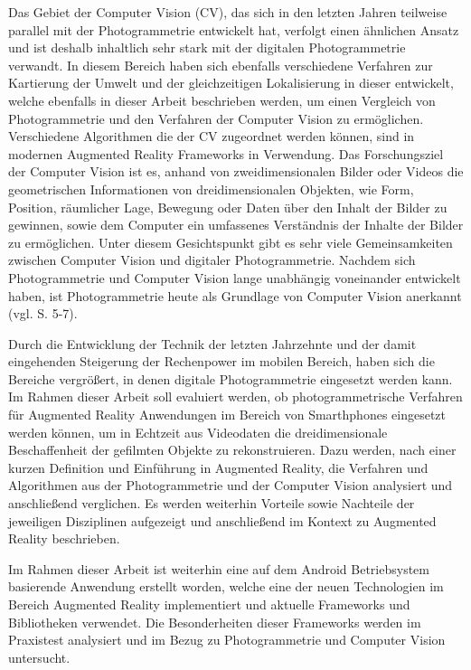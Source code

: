 Das Gebiet der Computer Vision (CV), das sich in den letzten Jahren teilweise parallel mit der Photogrammetrie entwickelt hat, verfolgt einen ähnlichen Ansatz und ist deshalb inhaltlich sehr stark mit der digitalen Photogrammetrie verwandt. In diesem Bereich haben sich ebenfalls verschiedene Verfahren zur Kartierung der Umwelt und der gleichzeitigen Lokalisierung in dieser entwickelt, welche ebenfalls in dieser Arbeit beschrieben werden, um einen Vergleich von Photogrammetrie und den Verfahren der Computer Vision zu ermöglichen. \\Verschiedene Algorithmen die der CV zugeordnet werden können, sind in modernen Augmented Reality Frameworks in Verwendung. Das Forschungsziel der Computer Vision ist es, anhand von zweidimensionalen Bilder oder Videos die geometrischen Informationen von dreidimensionalen Objekten, wie Form, Position, räumlicher Lage, Bewegung oder Daten über den Inhalt der Bilder zu gewinnen, sowie dem Computer ein umfassenes Verständnis der Inhalte der Bilder zu ermöglichen. Unter diesem Gesichtspunkt gibt es sehr viele Gemeinsamkeiten zwischen Computer Vision und digitaler Photogrammetrie. Nachdem sich Photogrammetrie und Computer Vision lange unabhängig voneinander entwickelt haben, ist Photogrammetrie heute als Grundlage von Computer Vision anerkannt (vgl. \cite{photo} S. 5-7).

Durch die Entwicklung der Technik der letzten Jahrzehnte und der damit eingehenden Steigerung der Rechenpower im mobilen Bereich, haben sich die Bereiche vergrößert, in denen digitale Photogrammetrie eingesetzt werden kann. Im Rahmen dieser Arbeit soll evaluiert werden, ob photogrammetrische Verfahren für Augmented Reality Anwendungen im Bereich von Smarthphones eingesetzt werden können, um in Echtzeit aus Videodaten die dreidimensionale Beschaffenheit der gefilmten Objekte zu rekonstruieren. Dazu werden, nach einer kurzen Definition und Einführung in Augmented Reality, die Verfahren und Algorithmen aus der Photogrammetrie und der Computer Vision analysiert und anschließend verglichen. Es werden weiterhin Vorteile sowie Nachteile der jeweiligen Disziplinen aufgezeigt und anschließend im Kontext zu Augmented Reality beschrieben.

Im Rahmen dieser Arbeit ist weiterhin eine auf dem Android Betriebsystem basierende Anwendung erstellt worden, welche eine der neuen Technologien im Bereich Augmented Reality implementiert und aktuelle Frameworks und Bibliotheken verwendet. Die Besonderheiten dieser Frameworks werden im Praxistest analysiert und im Bezug zu Photogrammetrie und Computer Vision untersucht.



  


